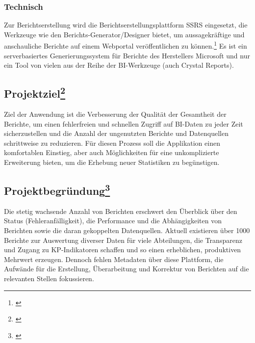 \subsubsection{Technisch}\label{sec:Ausgangssituation:Technisch}
Zur Berichtserstellung wird die Berichtserstellungsplattform \ac{SSRS} eingesetzt, die Werkzeuge wie den Berichts-Generator/Designer bietet, um aussagekräftige und anschauliche Berichte auf einem Webportal veröffentlichen zu können.\footnote{\Vgl \cite{Projektantrag}}
Es ist ein serverbasiertes Generierungssystem für Berichte des Herstellers Microsoft und nur ein Tool von vielen aus der Reihe der \ac{BI}-Werkzeuge (\zB auch Crystal Reports).



\subsection[Projektziel]{Projektziel\footnote{\cite{Projektantrag}}}\label{sec:Projektziel}
\begin{displayquote}
	Ziel der Anwendung ist die Verbesserung der Qualität der Gesamtheit der Berichte, um einen fehlerfreien und schnellen Zugriff auf \ac{BI}-Daten zu jeder Zeit sicherzustellen und die Anzahl der ungenutzten Berichte und Datenquellen schrittweise zu reduzieren. Für diesen Prozess soll die Applikation einen komfortablen Einstieg, aber auch Möglichkeiten für eine unkomplizierte Erweiterung bieten, um \ggfs die Erhebung neuer Statistiken zu begünstigen.
\end{displayquote}


\subsection[Projektbegründung]{Projektbegründung\footnote{\cite{Projektantrag}}}\label{sec:Projektbegruendung}
\begin{displayquote}
	Die stetig wachsende Anzahl von Berichten erschwert den Überblick über den Status (Fehleranfälligkeit), die Performance und die Abhängigkeiten von Berichten sowie die daran gekoppelten Datenquellen. Aktuell existieren über 1000 Berichte zur Auswertung diverser Daten für viele Abteilungen, die \ua Transparenz und Zugang zu \ac{KP}-Indikatoren schaffen und so einen erheblichen, produktiven Mehrwert erzeugen. Dennoch fehlen Metadaten über diese Plattform, die Aufwände für die Erstellung, Überarbeitung und Korrektur von Berichten auf die relevanten Stellen fokussieren.
\end{displayquote}

